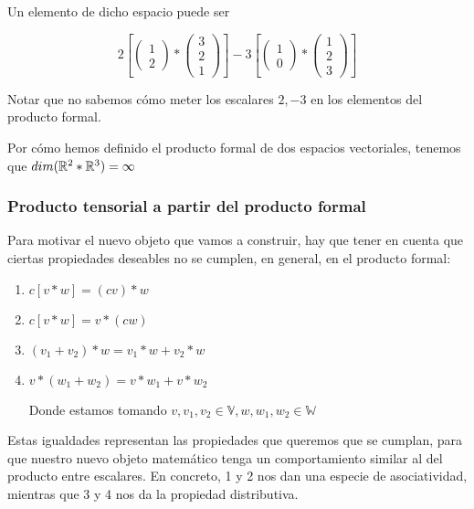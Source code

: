 Un elemento de dicho espacio puede ser

$$
2 \left[ \begin{pmatrix}1 \\ 2\end{pmatrix} \ast \begin{pmatrix}3 \\ 2 \\ 1 \end{pmatrix} \right]
- 3 \left[ \begin{pmatrix}1 \\ 0\end{pmatrix} \ast \begin{pmatrix}1 \\ 2 \\ 3 \end{pmatrix} \right]
$$

Notar que no sabemos cómo meter los escalares $2, -3$ en los elementos del producto formal.

Por cómo hemos definido el producto formal de dos espacios vectoriales, tenemos que $dim(\mathbb{R}^2 \ast \mathbb{R}^3) = \infty$

\subsubsection{Producto tensorial a partir del producto formal} \label{sec:cociente_prod_formal}

Para motivar el nuevo objeto que vamos a construir, hay que tener en cuenta que ciertas propiedades deseables no se cumplen, en general, en el producto formal:

\begin{enumerate}
    \item $c [v \ast w] = (cv) \ast w$
    \item $c[v \ast w] = v \ast (cw)$
    \item $(v_1 + v_2) \ast w = v_1 \ast w + v_2 \ast w$
    \item $v \ast (w_1 + w_2) = v \ast w_1 + v \ast w_2$

    Donde estamos tomando $v, v_1, v_2 \in \mathbb{V}, w, w_1, w_2 \in \mathbb{W}$
\end{enumerate}

Estas igualdades representan las propiedades que queremos que se cumplan, para que nuestro nuevo objeto matemático tenga un comportamiento similar al del producto entre escalares. En concreto, 1 y 2 nos dan una especie de asociatividad, mientras que 3 y 4 nos da la propiedad distributiva.

